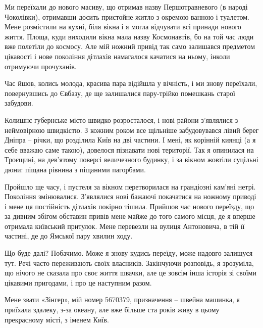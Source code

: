Ми переїхали до нового масиву, що отримав назву Першотравневого (в народі
Чоколівки), отримавши досить пристойне житло з окремою ванною і туалетом. Мене
розмістили на кухні, біля вікна і я могла відчувати всі принади нового життя.
Площа, куди виходили вікна мала назву Космонавтів, бо на той час люди вже
полетіли до космосу. Але мій ножний привід так само залишався предметом
цікавості і нове покоління дітлахів намагалося качатися на ньому, інколи
отримуючи прочуханів.

Час йшов, колись молода, красива пара відійшла у вічність, і ми знову
переїхали, повернувшись до Євбазу, де ще залишалися пару-трійко помешкань
старої забудови.

Колишнє губернське місто швидко розросталося, і нові райони з’являлися з
неймовірною швидкістю. З кожним роком все щільніше забудовувався лівий берег
Дніпра – річки, що розділила Київ на дві частини. І мені, як корінній киянці (а
я себе вважаю саме такою), довелося пізнавати нові території. Так я опинилася
на Троєщині, на дев’ятому поверсі величезного будинку, і за вікном жовтіли
суцільні дюни: піщана рівнина з піщаними пагорбами.

Пройшло ще часу, і пустеля за вікном перетворилася на грандіозні кам’яні нетрі.
Покоління змінювалися. З’являлися нові бажаючі покачатися на ножному приводі і
мене ця постійність дітлахів покірно тішила. Прийшов час нового переїзду, що за
дивним збігом обставин привів мене майже до того самого місця, де я вперше
отримала київський притулок. Мене перевезли на вулиця Антоновича, в тій її
частині, де до Ямської пару хвилин ходу.

Що буде далі? Побачимо. Може я знову кудись переїду, може надовго залишуся тут.
Речі часто переживають своїх власників. Закінчуючи розповідь, я зрозуміла, що
нічого не сказала про своє життя швачки, але це зовсім інша історія зі своїми
цікавими пригодами, і про це наступним разом.

Мене звати «Зінгер», мій номер 5670379, призначення – швейна машинка,  я
приїхала здалеку, з-за океану, але вже більше ста років живу в цьому
прекрасному місті, з іменем Київ.


